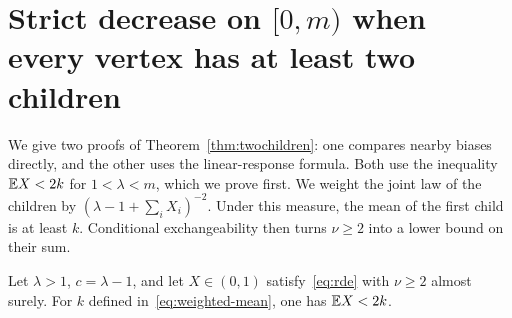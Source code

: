\section{Strict decrease on \texorpdfstring{$[0,m)$}{[0,m)} when every vertex has at least two children}\label{sec:twochildren}

We give two proofs of Theorem~\ref{thm:twochildren}: one compares nearby biases directly, and the other uses the linear-response formula. Both use the inequality $\mathbb E X<2k$ for $1<\lambda<m$, which we prove first. We weight the joint law of the children by $(\lambda-1+\sum_iX_i)^{-2}$. Under this measure, the mean of the first child is at least $k$. Conditional exchangeability then turns $\nu\ge2$ into a lower bound on their sum.

\begin{lemma}\label{lem:two-child}
Let $\lambda>1$, $c=\lambda-1$, and let $X\in(0,1)$ satisfy~\eqref{eq:rde} with $\nu\ge2$ almost surely. For $k$ defined in~\eqref{eq:weighted-mean}, one has $\mathbb E X<2k$.
\end{lemma}

